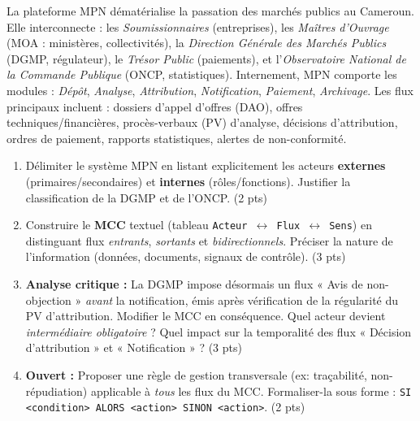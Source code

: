 \documentclass[11pt]{article}
\begin{document}
\begin{exercice}
La plateforme MPN dématérialise la passation des marchés publics au Cameroun. Elle interconnecte : les \textit{Soumissionnaires} (entreprises), les \textit{Maîtres d'Ouvrage} (MOA : ministères, collectivités), la \textit{Direction Générale des Marchés Publics} (DGMP, régulateur), le \textit{Trésor Public} (paiements), et l'\textit{Observatoire National de la Commande Publique} (ONCP, statistiques). Internement, MPN comporte les modules : \textit{Dépôt}, \textit{Analyse}, \textit{Attribution}, \textit{Notification}, \textit{Paiement}, \textit{Archivage}. Les flux principaux incluent : dossiers d'appel d'offres (DAO), offres techniques/financières, procès-verbaux (PV) d'analyse, décisions d'attribution, ordres de paiement, rapports statistiques, alertes de non-conformité.
\begin{enumerate}
    \item Délimiter le système MPN en listant explicitement les acteurs \textbf{externes} (primaires/secondaires) et \textbf{internes} (rôles/fonctions). Justifier la classification de la DGMP et de l'ONCP. (2 pts)
    \item Construire le \textbf{MCC} textuel (tableau \texttt{Acteur $\leftrightarrow$ Flux $\leftrightarrow$ Sens}) en distinguant flux \textit{entrants}, \textit{sortants} et \textit{bidirectionnels}. Préciser la nature de l'information (données, documents, signaux de contrôle). (3 pts)
    \item \textbf{Analyse critique :} La DGMP impose désormais un flux « Avis de non-objection » \textit{avant} la notification, émis après vérification de la régularité du PV d'attribution. Modifier le MCC en conséquence. Quel acteur devient \textit{intermédiaire obligatoire} ? Quel impact sur la temporalité des flux « Décision d'attribution » et « Notification » ? (3 pts)
    \item \textbf{Ouvert :} Proposer une règle de gestion transversale (ex: traçabilité, non-répudiation) applicable à \textit{tous} les flux du MCC. Formaliser-la sous forme : \texttt{SI <condition> ALORS <action> SINON <action>}. (2 pts)
\end{enumerate}
\end{exercice}
\end{document}
